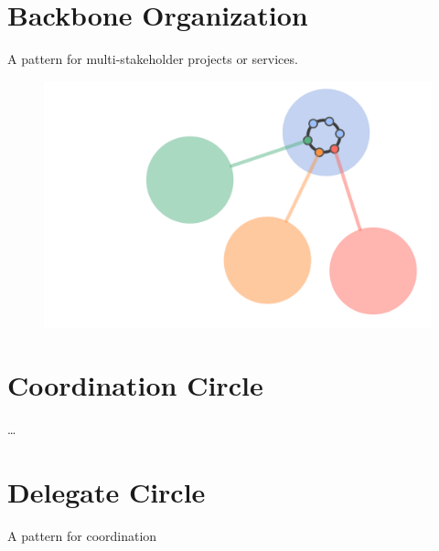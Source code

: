 \section{Backbone Organization}
\label{backboneorganization}

A pattern for multi-stakeholder projects or services.

\begin{figure}[htbp]
\centering
\includegraphics[keepaspectratio,width=\textwidth,height=0.75\textheight]{img/structural-patterns/backbone-organization.png}
\end{figure}

\section{Coordination Circle}
\label{coordinationcircle}

{\ldots}

\section{Delegate Circle}
\label{delegatecircle}

A pattern for coordination

